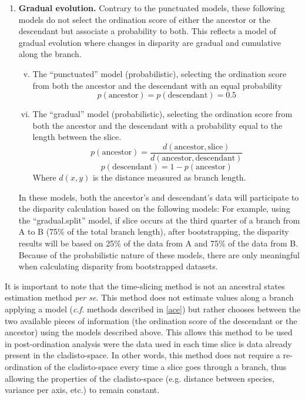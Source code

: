 \documentclass[12pt,a4paper]{article}
\begin{document}
\begin{enumerate}
    \item{\textbf{Gradual evolution.}}
    Contrary to the punctuated models, these following models do not select the ordination score of either the ancestor or the descendant but associate a probability to both.
    This reflects a model of gradual evolution where changes in disparity are gradual and cumulative along the branch.

    \begin{enumerate}[(i)]
    \setcounter{enumii}{4}
      \item The ``punctuated'' model (probabilistic), selecting the ordination score from both the ancestor and the descendant with an equal probability
          \begin{equation}
          p(\text{ancestor}) = p(\text{descendant}) = 0.5
          \end{equation}

    \item The ``gradual'' model (probabilistic), selecting the ordination score from both the ancestor and the descendant with a probability equal to the length between the slice.
          \begin{equation}
              p(\text{ancestor}) = \frac{d(\text{ancestor},\text{slice})}{d(\text{ancestor},\text{descendant})}
          \end{equation}
          \begin{equation}
              p(\text{descendant}) = 1 - p(\text{ancestor})
          \end{equation}
    \noindent Where $d(x,y)$ is the distance measured as branch length.
    \end{enumerate}

    In these models, both the ancestor's and descendant's data will participate to the disparity calculation based on the following models:
    For example, using the ``gradual.split'' model, if slice occurs at the third quarter of a branch from A to B (75\% of the total branch length), after bootstrapping, the disparity results will be based on 25\% of the data from A and 75\% of the data from B.
    Because of the probabilistic nature of these models, there are only meaningful when calculating disparity from bootstrapped datasets.
\end{enumerate}

It is important to note that the time-slicing method is not an ancestral states estimation method \textit{per se}.
This method does not estimate values along a branch applying a model (\textit{c.f.} methods described in \ref{ace}) but rather chooses between the two available pieces of information (the ordination score of the descendant or the ancestor) using the models described above.
This allows this method to be used in post-ordination analysis were the data used in each time slice is data already present in the cladisto-space.
In other words, this method does not require a re-ordination of the cladisto-space every time a slice goes through a branch, thus allowing the properties of the cladisto-space (e.g. distance between species, variance per axis, etc.) to remain constant.
\end{document}
